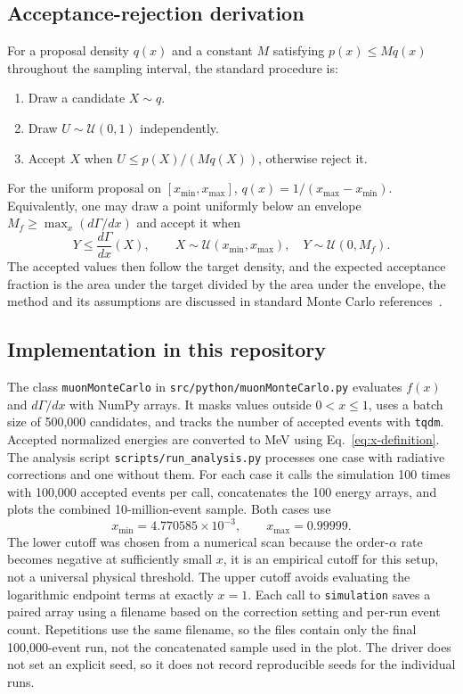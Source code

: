 \documentclass[conference]{IEEEtran}
\begin{document}
\subsection{Acceptance-rejection derivation}

For a proposal density $q(x)$ and a constant $M$ satisfying $p(x)\le Mq(x)$ throughout the sampling interval, the standard procedure is:
\begin{enumerate}
    \item Draw a candidate $X\sim q$.
    \item Draw $U\sim\mathcal{U}(0,1)$ independently.
    \item Accept $X$ when $U\le p(X)/(Mq(X))$, otherwise reject it.
\end{enumerate}
For the uniform proposal on $[x_{\min},x_{\max}]$, $q(x)=1/(x_{\max}-x_{\min})$. Equivalently, one may draw a point uniformly below an envelope $M_f\ge \max_x(d\Gamma/dx)$ and accept it when
\begin{equation}
    Y\le \frac{d\Gamma}{dx}(X),\qquad
    X\sim\mathcal{U}(x_{\min},x_{\max}),\quad
    Y\sim\mathcal{U}(0,M_f).
    \label{eq:rejection-test}
\end{equation}
The accepted values then follow the target density, and the expected acceptance fraction is the area under the target divided by the area under the envelope, the method and its assumptions are discussed in standard Monte Carlo references~\cite{Sirca_2016,Dunn_Shultis_2012,Nakade_2025}.

\subsection{Implementation in this repository}

The class \texttt{muonMonteCarlo} in \texttt{src/python/muonMonteCarlo.py} evaluates $f(x)$ and $d\Gamma/dx$ with NumPy arrays. It masks values outside $0<x\le 1$, uses a batch size of 500,000 candidates, and tracks the number of accepted events with \texttt{tqdm}. Accepted normalized energies are converted to MeV using Eq.~\eqref{eq:x-definition}. The analysis script \texttt{scripts/run\_analysis.py} processes one case with radiative corrections and one without them. For each case it calls the simulation 100 times with 100,000 accepted events per call, concatenates the 100 energy arrays, and plots the combined 10-million-event sample. Both cases use
\begin{equation}
    x_{\min}=4.770585\times10^{-3},\qquad x_{\max}=0.99999.
    \label{eq:simulation-range}
\end{equation}
The lower cutoff was chosen from a numerical scan because the order-$\alpha$ rate becomes negative at sufficiently small $x$, it is an empirical cutoff for this setup, not a universal physical threshold. The upper cutoff avoids evaluating the logarithmic endpoint terms at exactly $x=1$. Each call to \texttt{simulation} saves a paired array using a filename based on the correction setting and per-run event count. Repetitions use the same filename, so the files contain only the final 100,000-event run, not the concatenated sample used in the plot. The driver does not set an explicit seed, so it does not record reproducible seeds for the individual runs.
\end{document}
